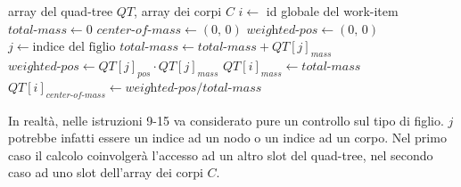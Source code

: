 \documentclass{article}
\begin{document}
\begin{algorithm}[h]
	\caption{Summarize tree (propagazione masse e centri di massa)}
	\begin{algorithmic}[1]
		\Require array del quad-tree $QT$, array dei corpi $C$
		\State $i \gets$ id globale del work-item
		\Return
		\EndIf
		\State $\textit{total-mass}\gets 0$
		\State $\textit{center-of-mass}\gets (0,\,0)$
		\State $\textit{weighted-pos}\gets (0,\,0)$
		\State $j \gets \text{indice del figlio}$
		\State $\textit{total-mass} \gets \textit{total-mass} + QT[j]_{mass}$
		\State $\textit{weighted-pos} \gets QT[j]_{pos} \cdot QT[j]_{mass}$
		\Else
		\State\Return
		\EndIf
		\EndFor
		\State $QT[i]_{mass} \gets \textit{total-mass}$
		\State $QT[i]_{\textit{center-of-mass}} \gets \textit{weighted-pos} / \textit{total-mass}$
	\end{algorithmic}
\end{algorithm}

In realtà, nelle istruzioni 9-15 va considerato pure un controllo sul tipo di figlio. $j$ potrebbe infatti essere un indice ad un nodo o un indice ad un corpo. Nel primo caso il calcolo coinvolgerà l'accesso ad un altro slot del quad-tree, nel secondo caso ad uno slot dell'array dei corpi $C$.
	
\end{document}
